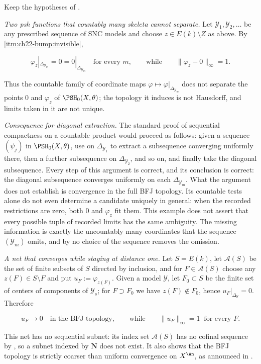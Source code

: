 \begin{example}
\label{ex:ch22-countable-blind-spot}
Keep the hypotheses of .

\emph{Two psh functions that countably many skeleta cannot separate.}  Let
$\mathcal Y_1,\mathcal Y_2,\ldots$ be any prescribed sequence of SNC models
and choose $z\in E(k)\setminus Z$ as above.  By
\,\cref{itm:ch22-bump:invisible},

\[
 \varphi_z|_{\Delta_{\mathcal Y_m}}=0=0|_{\Delta_{\mathcal Y_m}}
 \quad\text{for every }m,
 \qquad\text{while}\qquad
 \|\varphi_z-0\|_{\infty}=1 .
\tag{22.70}\label{eq:ch22-blind-spot}
\]

Thus the countable family of coordinate maps
$\varphi\mapsto\varphi|_{\Delta_{\mathcal Y_m}}$ does not separate the
points $0$ and $\varphi_z$ of $\PSH_0(X,\theta)$; the topology it
induces is not Hausdorff, and limits taken in it are not unique.

\emph{Consequence for diagonal extraction.}  The standard proof of
sequential compactness on a countable product would proceed as follows:
given a sequence $(\psi_j)$ in $\PSH_0(X,\theta)$, use
 on $\Delta_{\mathcal Y_1}$ to extract a
subsequence converging uniformly there, then a further subsequence on
$\Delta_{\mathcal Y_2}$, and so on, and finally take the diagonal
subsequence.  Every step of this argument is correct, and its conclusion is
correct: the diagonal subsequence converges uniformly on each
$\Delta_{\mathcal Y_m}$.  What the argument does not establish is
convergence in the full BFJ
topology.  Its countable tests alone do not even determine a candidate
uniquely in general: when the recorded restrictions are zero, both $0$ and
$\varphi_z$ fit them.  This example does not assert that every possible
tuple of recorded limits has the same ambiguity.  The missing
information is exactly the uncountably many coordinates that the sequence
$(\mathcal Y_m)$ omits, and by
 no choice of the sequence removes the
omission.

\emph{A net that converges while staying at distance one.}  Let $S=E(k)$,
let $\mathcal A(S)$ be the set of finite subsets of $S$ directed by
inclusion, and for $F\in\mathcal A(S)$ choose any $z(F)\in S\setminus F$
and put $u_F:=\varphi_{z(F)}$.  Given a model $\mathcal Y$, let
$F_0\subset S$ be the finite set of centers of components of
$\mathcal Y_s$; for $F\supset F_0$ we have $z(F)\notin F_0$, hence
$u_F|_{\Delta_{\mathcal Y}}=0$.  Therefore

\[
 u_F\longrightarrow0
 \quad\text{in the BFJ topology},
 \qquad\text{while}\qquad
 \|u_F\|_\infty=1\ \text{ for every }F .
\tag{22.71}\label{eq:ch22-net-at-distance-one}
\]

This net has no sequential subnet: its index set
$\mathcal A(S)$ has no cofinal sequence by
, so a subnet indexed by $\mathbf N$ does not
exist.  It also shows that the BFJ topology is strictly coarser than
uniform convergence on $X^{\An}$, as announced in
.
\end{example}

